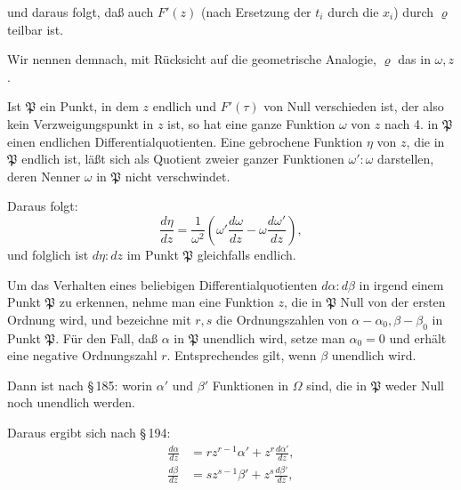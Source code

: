 und daraus folgt, daß auch $F'(z)$ (nach Ersetzung der $t_i$ durch die $x_i$) durch $\varrho$ teilbar ist.

Wir nennen demnach, mit Rücksicht auf die geometrische Analogie, $\varrho$ das  in $\omega, z$.

Ist $\mathfrak{P}$ ein Punkt, in dem $z$ endlich und $F'(\tau)$ von Null verschieden ist, der also kein Verzweigungspunkt in $z$ ist, so hat eine ganze Funktion $\omega$ von $z$ nach 4. in $\mathfrak{P}$ einen endlichen Differentialquotienten. Eine gebrochene Funktion $\eta$ von $z$, die in $\mathfrak{P}$ endlich ist, läßt sich als Quotient zweier ganzer Funktionen $\omega' : \omega$ darstellen, deren Nenner $\omega$ in $\mathfrak{P}$ nicht verschwindet.

Daraus folgt:
\[
\frac{d\eta}{dz} = \frac{1}{\omega^2}\left(\omega'\frac{d\omega}{dz} - \omega\frac{d\omega'}{dz}\right),
\]
und folglich ist $d\eta : dz$ im Punkt $\mathfrak{P}$ gleichfalls endlich.

Um das Verhalten eines beliebigen Differentialquotienten $d\alpha : d\beta$ in irgend einem Punkt $\mathfrak{P}$ zu erkennen, nehme man eine Funktion $z$, die in $\mathfrak{P}$ Null von der ersten Ordnung wird, und bezeichne mit $r, s$ die Ordnungszahlen von $\alpha - \alpha_0, \beta - \beta_0$ in Punkt $\mathfrak{P}$. Für den Fall, daß $\alpha$ in $\mathfrak{P}$ unendlich wird, setze man $\alpha_0 = 0$ und erhält eine negative Ordnungszahl $r$. Entsprechendes gilt, wenn $\beta$ unendlich wird.

Dann ist nach \S\,185:
worin $\alpha'$ und $\beta'$ Funktionen in $\Omega$ sind, die in $\mathfrak{P}$ weder Null noch unendlich werden.

Daraus ergibt sich nach \S\,194:
\[
\begin{aligned}
\frac{d\alpha}{dz} &= r z^{r-1}\alpha' + z^r\frac{d\alpha'}{dz},\\
\frac{d\beta}{dz} &= s z^{s-1}\beta' + z^s\frac{d\beta'}{dz},
\end{aligned}
\]
